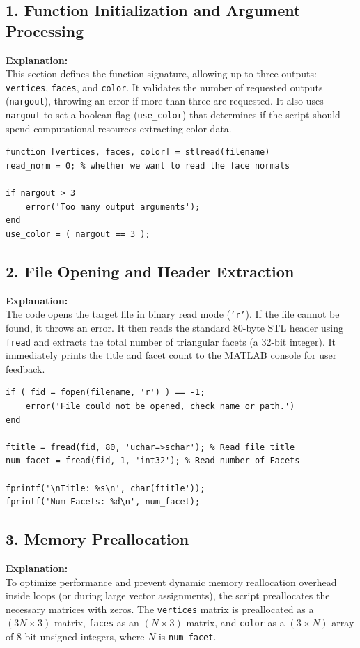 \subsection{1. Function Initialization and Argument Processing}
\textbf{Explanation:} \\
This section defines the function signature, allowing up to three outputs: \texttt{vertices}, \texttt{faces}, and \texttt{color}. It validates the number of requested outputs (\texttt{nargout}), throwing an error if more than three are requested. It also uses \texttt{nargout} to set a boolean flag (\texttt{use\_color}) that determines if the script should spend computational resources extracting color data.

\begin{lstlisting}
function [vertices, faces, color] = stlread(filename)
read_norm = 0; % whether we want to read the face normals

if nargout > 3
    error('Too many output arguments');
end
use_color = ( nargout == 3 );
\end{lstlisting}


\subsection{2. File Opening and Header Extraction}
\textbf{Explanation:} \\
The code opens the target file in binary read mode (\texttt{'r'}). If the file cannot be found, it throws an error. It then reads the standard 80-byte STL header using \texttt{fread} and extracts the total number of triangular facets (a 32-bit integer). It immediately prints the title and facet count to the MATLAB console for user feedback.

\begin{lstlisting}
if ( fid = fopen(filename, 'r') ) == -1;
    error('File could not be opened, check name or path.')
end

ftitle = fread(fid, 80, 'uchar=>schar'); % Read file title
num_facet = fread(fid, 1, 'int32'); % Read number of Facets

fprintf('\nTitle: %s\n', char(ftitle'));
fprintf('Num Facets: %d\n', num_facet);
\end{lstlisting}


\subsection{3. Memory Preallocation}
\textbf{Explanation:} \\
To optimize performance and prevent dynamic memory reallocation overhead inside loops (or during large vector assignments), the script preallocates the necessary matrices with zeros. The \texttt{vertices} matrix is preallocated as a $(3N \times 3)$ matrix, \texttt{faces} as an $(N \times 3)$ matrix, and \texttt{color} as a $(3 \times N)$ array of 8-bit unsigned integers, where $N$ is \texttt{num\_facet}.

